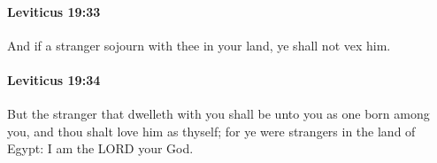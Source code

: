 		\paragraph{Leviticus 19:33} %
			\label{LEVITICUS-19-33}

			And if a stranger sojourn with thee in your land, ye shall not vex him.


		\paragraph{Leviticus 19:34} %
			\label{LEVITICUS-19-34}

			But the stranger that dwelleth with you shall be unto you as one born among you, and thou shalt love him as thyself; for ye were strangers in the land of Egypt: I am the LORD your God.


